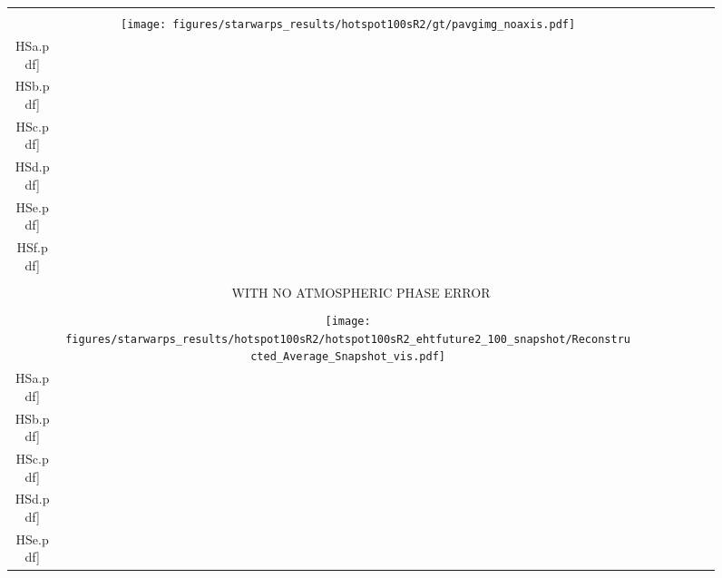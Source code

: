 \begin{figure}
\begin{center}
\begin{tabular}{  c | c | c  c  c  c  c c }
			&\vspace{-.1in} &&&&&&\\
			\multirow{1}{*}[.6in]{ \rotatebox[origin=t]{90}{\large{\textsf{Truth}} }}
			&
			{{\texttt{[image: figures/starwarps\_results/hotspot100sR2/gt/pavgimg\_noaxis.pdf]}} } &
			\texttt{[image: figures/starwarps\_results/hotspot100sR2/gt/frames/gt\_noaxis\_\\HSa.pdf]} &
			\texttt{[image: figures/starwarps\_results/hotspot100sR2/gt/frames/gt\_noaxis\_\\HSb.pdf]} &
			\texttt{[image: figures/starwarps\_results/hotspot100sR2/gt/frames/gt\_noaxis\_\\HSc.pdf]} &
			\texttt{[image: figures/starwarps\_results/hotspot100sR2/gt/frames/gt\_noaxis\_\\HSd.pdf]} &
			\texttt{[image: figures/starwarps\_results/hotspot100sR2/gt/frames/gt\_noaxis\_\\HSe.pdf]} &
			\texttt{[image: figures/starwarps\_results/hotspot100sR2/gt/frames/gt\_noaxis\_\\HSf.pdf]} 
			\\   \hline
			&\vspace{-.1in} &&&&&&\\
			\multicolumn{8}{c}{  \large{\textsf{WITH NO ATMOSPHERIC PHASE ERROR }}  }
			\\ \hline
			&\vspace{-.1in} &&&&&&\\
			\multirow{1}{*}[.6in]{ \rotatebox[origin=t]{90}{\small{\textsf{Snapshot}} }}
			&
			{{\texttt{[image: figures/starwarps\_results/hotspot100sR2/hotspot100sR2\_ehtfuture2\_100\_snapshot/Reconstructed\_Average\_Snapshot\_vis.pdf]}} } &
			\texttt{[image: figures/starwarps\_results/hotspot100sR2/hotspot100sR2\_ehtfuture2\_100\_snapshot/Reconstructed\_Snapshot\_vis\_\\HSa.pdf]} &
			\texttt{[image: figures/starwarps\_results/hotspot100sR2/hotspot100sR2\_ehtfuture2\_100\_snapshot/Reconstructed\_Snapshot\_vis\_\\HSb.pdf]} &
			\texttt{[image: figures/starwarps\_results/hotspot100sR2/hotspot100sR2\_ehtfuture2\_100\_snapshot/Reconstructed\_Snapshot\_vis\_\\HSc.pdf]} &
			\texttt{[image: figures/starwarps\_results/hotspot100sR2/hotspot100sR2\_ehtfuture2\_100\_snapshot/Reconstructed\_Snapshot\_vis\_\\HSd.pdf]} &
			\texttt{[image: figures/starwarps\_results/hotspot100sR2/hotspot100sR2\_ehtfuture2\_100\_snapshot/Reconstructed\_Snapshot\_vis\_\\HSe.pdf]} &

\end{tabular}
\end{center}
\end{figure}
